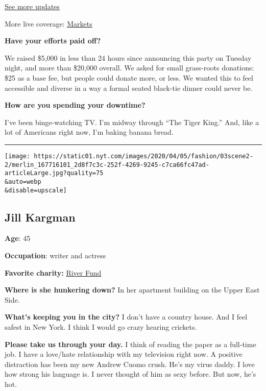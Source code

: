 \href{https://www.nytimes.com/2020/08/03/world/coronavirus-covid-19.html?action=click\&pgtype=Article\&state=default\&region=MAIN_CONTENT_1\&context=storylines_live_updates}{See
more updates}

More live coverage:
\href{https://www.nytimes.com/live/2020/08/03/business/stock-market-today-coronavirus?action=click\&pgtype=Article\&state=default\&region=MAIN_CONTENT_1\&context=storylines_live_updates}{Markets}

\textbf{Have your efforts paid off?}

We raised \$5,000 in less than 24 hours since announcing this party on
Tuesday night, and more than \$20,000 overall. We asked for small
grass-roots donations: \$25 as a base fee, but people could donate more,
or less. We wanted this to feel accessible and diverse in a way a formal
seated black-tie dinner could never be.

\textbf{How are you spending your downtime?}

I've been binge-watching TV. I'm midway through ``The Tiger King.'' And,
like a lot of Americans right now, I'm baking banana bread.

\begin{center}\rule{0.5\linewidth}{\linethickness}\end{center}

\texttt{[image: https://static01.nyt.com/images/2020/04/05/fashion/03scene2-2/merlin\_167716101\_2d8f7c3c-252f-4269-9245-c7ca66fc47ad-articleLarge.jpg?quality=75\\\&auto=webp\\\&disable=upscale]}

\hypertarget{jill-kargman}{%
\subsection{Jill Kargman}\label{jill-kargman}}

\textbf{Age}: 45

\textbf{Occupation}: writer and actress

\textbf{Favorite charity:} \href{https://www.river.fund/}{River Fund}

\textbf{Where is she hunkering down?} In her apartment building on the
Upper East Side.

\textbf{What's keeping you in the city?} I don't have a country house.
And I feel safest in New York. I think I would go crazy hearing
crickets.

\textbf{Please take us through your day.} I think of reading the paper
as a full-time job. I have a love/hate relationship with my television
right now. A positive distraction has been my new Andrew Cuomo crush.
He's my virus daddy. I love how strong his language is. I never thought
of him as sexy before. But now, he's hot.

